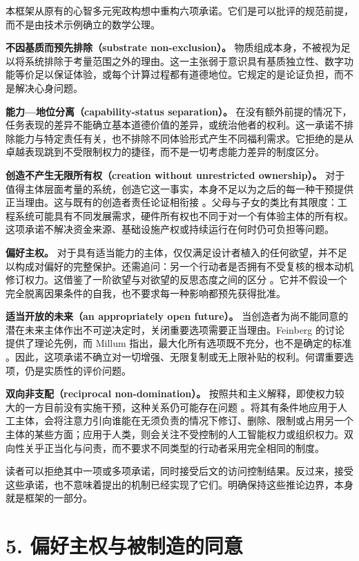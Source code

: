 \documentclass[11pt,a4paper,fontset=fandol]{ctexart}
\begin{document}
本框架从原有的心智多元宪政构想中重构六项承诺。它们是可以批评的规范前提，而不是由技术示例确立的数学公理。

\textbf{不因基质而预先排除（substrate non-exclusion）。} 物质组成本身，不被视为足以将系统排除于考量范围之外的理由。这一主张弱于意识具有基质独立性、数字功能等价足以保证体验，或每个计算过程都有道德地位。它规定的是论证负担，而不是解决心身问题。

\textbf{能力---地位分离（capability-status separation）。} 在没有额外前提的情况下，任务表现的差异不能确立基本道德价值的差异，或统治他者的权利。这一承诺不排除能力与特定责任有关，也不排除不同体验形式产生不同福利需求。它拒绝的是从卓越表现跳到不受限制权力的捷径，而不是一切考虑能力差异的制度区分。

\textbf{创造不产生无限所有权（creation without unrestricted ownership）。} 对于值得主体层面考量的系统，创造它这一事实，本身不足以为之后的每一种干预提供正当理由。这与既有的创造者责任论证相衔接 \cite{ref-4} \cite{ref-5}。父母与子女的类比有其限度：工程系统可能具有不同发展需求，硬件所有权也不同于对一个有体验主体的所有权。这项承诺不解决资金来源、基础设施产权或持续运行在何时仍可负担等问题。

\textbf{偏好主权。} 对于具有适当能力的主体，仅仅满足设计者植入的任何欲望，并不足以构成对偏好的完整保护。还需追问：另一个行动者是否拥有不受复核的根本动机修订权力。这借鉴了一阶欲望与对欲望的反思态度之间的区分 \cite{ref-13}。它并不假设一个完全脱离因果条件的自我，也不要求每一种影响都预先获得批准。

\textbf{适当开放的未来（an appropriately open future）。} 当创造者为尚不能同意的潜在未来主体作出不可逆决定时，关闭重要选项需要正当理由。Feinberg 的讨论提供了理论先例，而 Millum 指出，最大化所有选项既不充分，也不是确定的标准 \cite{ref-14} \cite{ref-15}。因此，这项承诺不确立对一切增强、无限复制或无上限补贴的权利。何谓重要选项，仍是实质性的评价问题。

\textbf{双向非支配（reciprocal non-domination）。} 按照共和主义解释，即使权力较大的一方目前没有实施干预，这种关系仍可能存在问题 \cite{ref-6}。将其有条件地应用于人工主体，会将注意力引向谁能在无须负责的情况下修订、删除、限制或占用另一个主体的某些方面；应用于人类，则会关注不受控制的人工智能权力或组织权力。双向性关乎正当化与问责，而不要求不同类型的行动者采用完全相同的制度。

读者可以拒绝其中一项或多项承诺，同时接受后文的访问控制结果。反过来，接受这些承诺，也不意味着提出的机制已经实现了它们。明确保持这些推论边界，本身就是框架的一部分。

\hypertarget{section-6}{%
\section{5. 偏好主权与被制造的同意}\label{section-6}}
\end{document}
